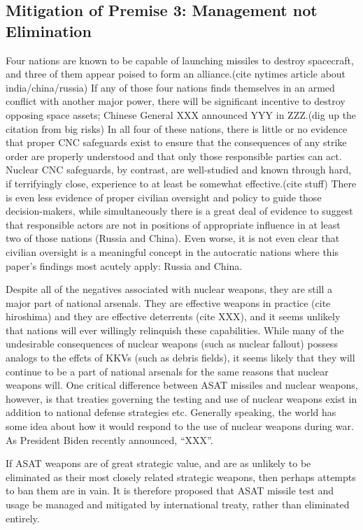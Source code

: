 \subsection{Mitigation of Premise 3: Management not Elimination}
Four nations are known to be capable of launching missiles to destroy spacecraft, and three of them appear poised to form an alliance.(cite nytimes article about india/china/russia)  If any of those four nations finds themselves in an armed conflict with another major power, there will be significant incentive to destroy opposing space assets; Chinese General XXX announced YYY in ZZZ.(dig up the citation from big risks)  In all four of these nations, there is little or no evidence that proper CNC safeguards exist to ensure that the consequences of any strike order are properly understood and that only those responsible parties can act.  Nuclear CNC safeguards, by contrast, are well-studied and known through hard, if terrifyingly close, experience to at least be somewhat effective.(cite stuff)  There is even less evidence of proper civilian oversight and policy to guide those decision-makers, while simultaneously there is a great deal of evidence to suggest that responsible actors are not in positions of appropriate influence in at least two of those nations (Russia and China).  Even worse, it is not even clear that civilian oversight is a meaningful concept in the autocratic nations where this paper's findings most acutely apply: Russia and China.

Despite all of the negatives associated with nuclear weapons, they are still a major part of national arsenals.  They are effective weapons in practice (cite hiroshima) and they are effective deterrents (cite XXX), and it seems unlikely that nations will ever willingly relinquish these capabilities.  While many of the undesirable consequences of nuclear weapons (such as nuclear fallout) possess analogs to the effcts of KKVs (such as debris fields), it seems likely that they will continue to be a part of national arsenals for the same reasons that nuclear weapons will.  One critical difference between ASAT missiles and nuclear weapons, however, is that treaties governing the testing and use of nuclear weapons exist in addition to national defense strategies etc.  Generally speaking, the world has some idea about how it would respond to the use of nuclear weapons during war.  As President Biden recently announced, ``XXX''.

If ASAT weapons are of great strategic value, and are as unlikely to be eliminated as their most closely related strategic weapons, then perhaps attempts to ban them are in vain.  It is therefore proposed that ASAT missile test and usage be managed and mitigated by international treaty, rather than eliminated entirely.

